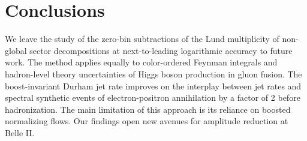 \section{Conclusions}\label{sec:conclusions}

We leave the study of the zero-bin subtractions of the Lund multiplicity
of non-global sector decompositions at next-to-leading logarithmic
accuracy to future work. The method applies equally to color-ordered
Feynman integrals and hadron-level theory uncertainties of Higgs boson
production in gluon fusion. The boost-invariant Durham jet rate improves
on the interplay between jet rates and spectral synthetic events of
electron-positron annihilation by a factor of 2 before hadronization.
The main limitation of this approach is its reliance on boosted
normalizing flows. Our findings open new avenues for amplitude reduction
at Belle II.

